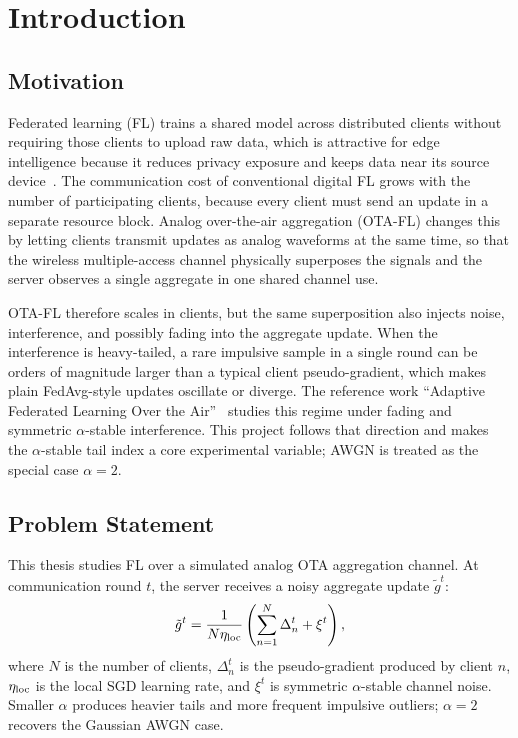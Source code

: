 \chapter{Introduction}

\section{Motivation}
Federated learning (FL) trains a shared model across distributed
clients without requiring those clients to upload raw data, which is
attractive for edge intelligence because it reduces privacy exposure
and keeps data near its source device~\cite{mcmahan2017communication}.
The communication cost of conventional digital FL grows with the number
of participating clients, because every client must send an update in a
separate resource block. Analog over-the-air aggregation (OTA-FL) changes
this by letting clients transmit updates as analog waveforms at the
same time, so that the wireless multiple-access channel physically
superposes the signals and the server observes a single aggregate in
one shared channel use.

OTA-FL therefore scales in clients, but the same superposition also
injects noise, interference, and possibly fading into the aggregate
update. When the interference is heavy-tailed, a rare impulsive sample
in a single round can be orders of magnitude larger than a typical
client pseudo-gradient, which makes plain FedAvg-style updates
oscillate or diverge. The reference work ``Adaptive Federated Learning
Over the Air''~\cite{wang2024adaptive} studies this regime under
fading and symmetric $\alpha$-stable interference. This project
follows that direction and makes the $\alpha$-stable tail index a
core experimental variable; AWGN is treated as the special case
$\alpha=2$.

\section{Problem Statement}
This thesis studies FL over a simulated analog OTA aggregation
channel. At communication round $t$, the server receives a noisy
aggregate update $\tilde{g}^t$:
\begin{equation}
    \tilde{g}^t =
    \frac{1}{N\eta_{\rm loc}}\left(\sum_{n=1}^{N} \Delta_n^t + \xi^t\right),
\end{equation}
where $N$ is the number of clients, $\Delta_n^t$ is the pseudo-gradient
produced by client $n$, $\eta_{\rm loc}$ is the local SGD learning rate,
and $\xi^t$ is symmetric $\alpha$-stable channel noise. Smaller $\alpha$
produces heavier tails and more frequent impulsive outliers; $\alpha=2$
recovers the Gaussian AWGN case.

